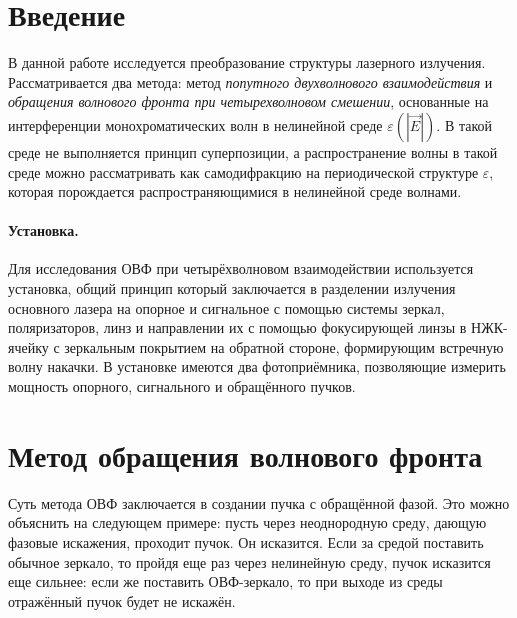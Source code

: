 \documentclass[a5paper,11pt]{extarticle}
\begin{document}


\tableofcontents
\newpage



\section*{Введение}
\vspace{-0.5em}
В данной работе исследуется преобразование структуры лазерного излучения. Рассматривается два метода: метод \textit{попутного двухволнового взаимодействия} и \textit{обращения волнового фронта при четырехволновом смешении}, основанные на интерференции монохроматических волн в нелинейной среде $\varepsilon(|\vec{E}|)$. В такой среде не выполняется принцип суперпозиции, а распространение волны в такой среде можно рассматривать как самодифракцию на периодической структуре $\varepsilon$, которая порождается распространяющимися в нелинейной среде волнами.



\vspace{-0.5em}

\paragraph{Установка.} Для исследования ОВФ при четырёхволновом взаимодействии используется установка, общий принцип который заключается в разделении излучения основного лазера на опорное и сигнальное с помощью системы зеркал, поляризаторов, линз и направлении их с помощью фокусирующей линзы в НЖК-ячейку с зеркальным покрытием на обратной стороне, формирующим встречную волну накачки. В установке имеются два фотоприёмника, позволяющие измерить мощность опорного, сигнального и обращённого пучков. 

\newpage


\section{Метод обращения волнового фронта}
Суть метода ОВФ заключается в создании пучка с обращённой фазой. Это можно объяснить на следующем примере: пусть через неоднородную среду, дающую фазовые искажения, проходит пучок. Он исказится. Если за средой поставить обычное зеркало, то пройдя еще раз через нелинейную среду, пучок исказится еще сильнее: если же поставить ОВФ-зеркало, то при выходе из среды отражённый пучок будет не искажён. 
\end{document}
